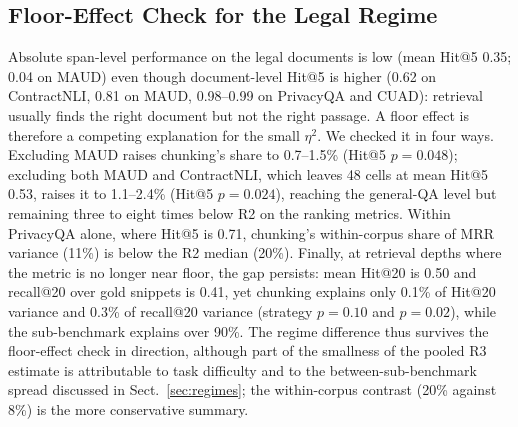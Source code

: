\documentclass[runningheads]{llncs}
\begin{document}
\subsection{Floor-Effect Check for the Legal Regime}
\label{sec:floor}
Absolute span-level performance on the legal documents is low (mean Hit@5 0.35; 0.04 on MAUD) even though document-level Hit@5 is higher (0.62 on ContractNLI, 0.81 on MAUD, 0.98--0.99 on PrivacyQA and CUAD): retrieval usually finds the right document but not the right passage. A floor effect is therefore a competing explanation for the small $\eta^2$. We checked it in four ways. Excluding MAUD raises chunking's share to 0.7--1.5\% (Hit@5 $p=0.048$); excluding both MAUD and ContractNLI, which leaves 48 cells at mean Hit@5 0.53, raises it to 1.1--2.4\% (Hit@5 $p=0.024$), reaching the general-QA level but remaining three to eight times below R2 on the ranking metrics. Within PrivacyQA alone, where Hit@5 is 0.71, chunking's within-corpus share of MRR variance (11\%) is below the R2 median (20\%). Finally, at retrieval depths where the metric is no longer near floor, the gap persists: mean Hit@20 is 0.50 and recall@20 over gold snippets is 0.41, yet chunking explains only 0.1\% of Hit@20 variance and 0.3\% of recall@20 variance (strategy $p=0.10$ and $p=0.02$), while the sub-benchmark explains over 90\%. The regime difference thus survives the floor-effect check in direction, although part of the smallness of the pooled R3 estimate is attributable to task difficulty and to the between-sub-benchmark spread discussed in Sect.~\ref{sec:regimes}; the within-corpus contrast (20\% against 8\%) is the more conservative summary.
\end{document}
